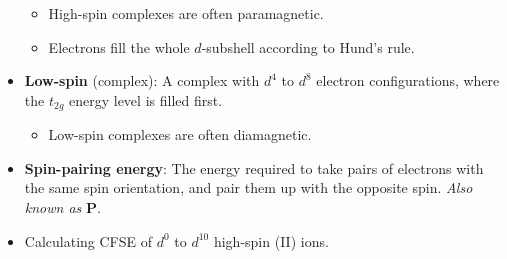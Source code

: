 \documentclass[../notes.tex]{subfiles}
\begin{document}
\begin{itemize}
    \begin{itemize}
        \item High-spin complexes are often paramagnetic.
        \item Electrons fill the whole $d$-subshell according to Hund's rule.
    \end{itemize}
    \item \textbf{Low-spin} (complex): A complex with $d^4$ to $d^8$ electron configurations, where the $t_{2g}$ energy level is filled first.
    \begin{itemize}
        \item Low-spin complexes are often diamagnetic.
    \end{itemize}
    \item \textbf{Spin-pairing energy}: The energy required to take pairs of electrons with the same spin orientation, and pair them up with the opposite spin. \emph{Also known as} $\bm{P}$.
    \item Calculating CFSE of $d^0$ to $d^{10}$ high-spin  (II) ions.
    \begin{figure}[H]
        \centering
\end{figure}
\end{itemize}
\end{document}

